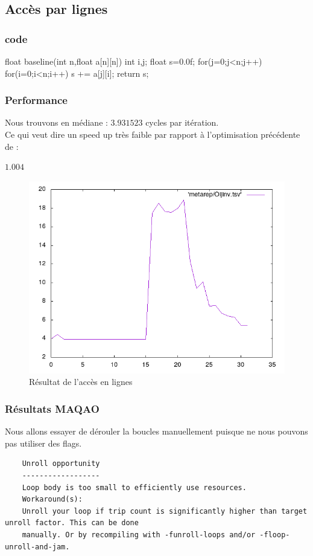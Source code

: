 \documentclass{report}
\begin{document}
  \subsection{Accès par lignes}
  \subsubsection{code}
  \begin{cc}
    float baseline(int n,float a[n][n])
    {
        int i,j;
        float s=0.0f;
        for(j=0;j<n;j++)
            for(i=0;i<n;i++)
                s += a[j][i];
        return s;
    }
  \end{cc}
  \subsubsection{Performance}
  Nous trouvons en médiane : $3.931523$ cycles par itération.\\
  Ce qui veut dire un speed up très faible par rapport à l'optimisation précédente de :
  \begin{center}
      $1.004$
  \end{center}
  \begin{figure}[ht!]
    \centering
    \includegraphics[scale=0.45]{../metarep/Oijinv.png}
    \caption{Résultat de l'accès en lignes}
  \end{figure}
  \subsubsection{Résultats MAQAO}
  Nous allons essayer de dérouler la boucles manuellement puisque ne nous pouvons pas utiliser
  des flags.
  \begin{verbatim}
    Unroll opportunity
    ------------------
    Loop body is too small to efficiently use resources.
    Workaround(s):
    Unroll your loop if trip count is significantly higher than target unroll factor. This can be done
    manually. Or by recompiling with -funroll-loops and/or -floop-unroll-and-jam.
  \end{verbatim}
\end{document}
